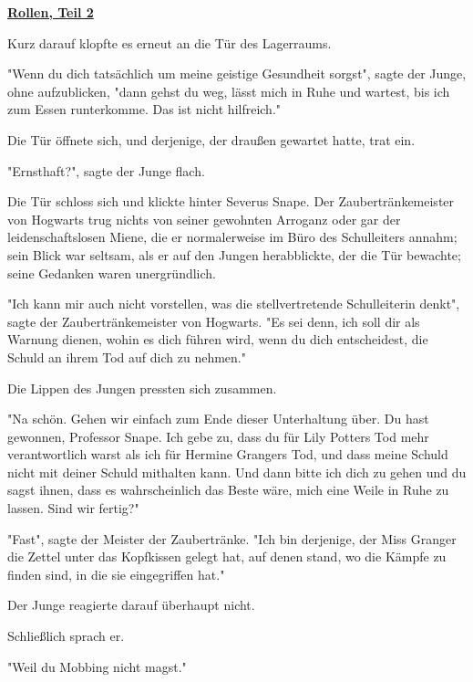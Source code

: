 

\hypertarget{rollen-teil-2}{%

\textbf{\uline{Rollen, Teil 2}}

Kurz darauf klopfte es erneut an die Tür des Lagerraums.

"Wenn du dich tatsächlich um meine geistige Gesundheit sorgst", sagte der Junge, ohne aufzublicken, "dann gehst du weg, lässt mich in Ruhe und wartest, bis ich zum Essen runterkomme. Das ist nicht hilfreich."

Die Tür öffnete sich, und derjenige, der draußen gewartet hatte, trat ein.

"Ernsthaft?", sagte der Junge flach.

Die Tür schloss sich und klickte hinter Severus Snape. Der Zaubertränkemeister von Hogwarts trug nichts von seiner gewohnten Arroganz oder gar der leidenschaftslosen Miene, die er normalerweise im Büro des Schulleiters annahm; sein Blick war seltsam, als er auf den Jungen herabblickte, der die Tür bewachte; seine Gedanken waren unergründlich.

"Ich kann mir auch nicht vorstellen, was die stellvertretende Schulleiterin denkt", sagte der Zaubertränkemeister von Hogwarts. "Es sei denn, ich soll dir als Warnung dienen, wohin es dich führen wird, wenn du dich entscheidest, die Schuld an ihrem Tod auf dich zu nehmen."

Die Lippen des Jungen pressten sich zusammen.

"Na schön. Gehen wir einfach zum Ende dieser Unterhaltung über. Du hast gewonnen, Professor Snape. Ich gebe zu, dass du für Lily Potters Tod mehr verantwortlich warst als ich für Hermine Grangers Tod, und dass meine Schuld nicht mit deiner Schuld mithalten kann. Und dann bitte ich dich zu gehen und du sagst ihnen, dass es wahrscheinlich das Beste wäre, mich eine Weile in Ruhe zu lassen. Sind wir fertig?"

"Fast", sagte der Meister der Zaubertränke. "Ich bin derjenige, der Miss Granger die Zettel unter das Kopfkissen gelegt hat, auf denen stand, wo die Kämpfe zu finden sind, in die sie eingegriffen hat."

Der Junge reagierte darauf überhaupt nicht.

Schließlich sprach er.

"Weil du Mobbing nicht magst."

}
